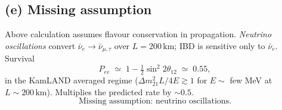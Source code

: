 \documentclass[11pt]{article}
\begin{document}
\subsection*{(e) Missing assumption}

Above calculation assumes flavour conservation in propagation. \emph{Neutrino oscillations} convert $\bar\nu_{e}\to\bar\nu_{\mu,\tau}$ over $L=200\,\text{km}$; IBD is sensitive only to $\bar\nu_{e}$. Survival
\[
P_{ee}\;\simeq\;1-\tfrac{1}{2}\sin^{2}2\theta_{12}\;\simeq\;0.55,
\]
in the KamLAND averaged regime ($\Delta m_{21}^{2}L/4E\gtrsim 1$ for $E\sim$ few MeV at $L\sim 200\,\text{km}$). Multiplies the predicted rate by $\sim 0.5$.
\begin{equation}
\boxed{\;\text{Missing assumption: neutrino oscillations.}\;}
\end{equation}
\end{document}
